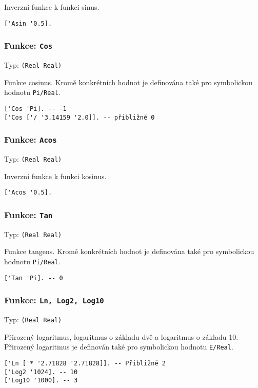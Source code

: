 Inverzní funkce k funkci sinus.

\begin{lstlisting}[caption={Ukázka využití Asin}]
['Asin '0.5].
\end{lstlisting}

\subsubsection*{Funkce: \lstinline{Cos}}
Typ: \lstinline{(Real Real)}

Funkce cosinus. Kromě konkrétních hodnot je definována také pro symbolickou hodnotu
\lstinline{Pi/Real}.

\begin{lstlisting}[caption={Ukázka využití Cos}]
['Cos 'Pi]. -- -1
['Cos ['/ '3.14159 '2.0]]. -- přibližně 0
\end{lstlisting}

\subsubsection*{Funkce: \lstinline{Acos}}
Typ: \lstinline{(Real Real)}

Inverzní funkce k funkci kosinus.

\begin{lstlisting}[caption={Ukázka využití Acos}]
['Acos '0.5].
\end{lstlisting}

\subsubsection*{Funkce: \lstinline{Tan}}
Typ: \lstinline{(Real Real)}

Funkce tangens. Kromě konkrétních hodnot je definována také pro symbolickou hodnotu
\lstinline{Pi/Real}.

\begin{lstlisting}[caption={Ukázka využití Tan}]
['Tan 'Pi]. -- 0
\end{lstlisting}

\subsubsection*{Funkce: \lstinline{Ln, Log2, Log10}}
Typ: \lstinline{(Real Real)}

Přirozený logaritmus, logaritmus o základu dvě a logaritmus o základu 10. Přirozený logaritmus
je definován také pro symbolickou hodnotu \lstinline{E/Real}.

\begin{lstlisting}[caption={Ukázka využití Ln, Log2, Log10}]
['Ln ['* '2.71828 '2.71828]]. -- Přibližně 2
['Log2 '1024]. -- 10
['Log10 '1000]. -- 3
\end{lstlisting}

